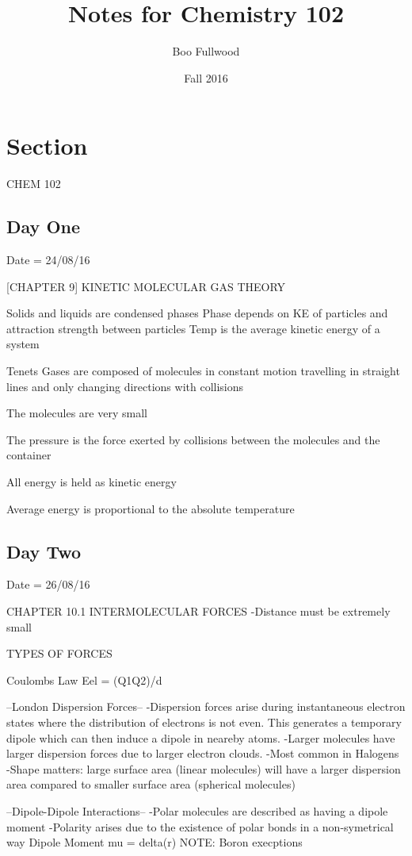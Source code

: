 \documentclass{article}
\title{Notes for Chemistry 102}
\date{Fall 2016}
\author{Boo Fullwood}
\begin{document}
\maketitle
{}
\newpage

\section{Section}
CHEM 102

\subsection{Day One}
Date = 24/08/16

[CHAPTER 9]
KINETIC MOLECULAR GAS THEORY

Solids and liquids are condensed phases
Phase depends on KE of particles and attraction strength between particles
Temp is the average kinetic energy of a system

Tenets
Gases are composed of molecules in constant motion travelling in straight lines
and only changing directions with collisions

The molecules are very small

The pressure is the force exerted by collisions between the molecules and the
container

All energy is held as kinetic energy

Average energy is proportional to the absolute temperature
\subsection{Day Two}
Date = 26/08/16

CHAPTER 10.1
INTERMOLECULAR FORCES
-Distance must be extremely small

TYPES OF FORCES

{Coulombs Law
Eel = (Q1Q2)/d}

--London Dispersion Forces--
-Dispersion forces arise during instantaneous electron states where the
distribution of electrons is not even. This generates a temporary dipole which
can then induce a dipole in neareby atoms. 
-Larger molecules have larger dispersion forces due to larger electron clouds.
-Most common in Halogens
-Shape matters: large surface area (linear molecules) will have a larger
dispersion area compared to smaller surface area (spherical molecules)

--Dipole-Dipole Interactions--
-Polar molecules are described as having a dipole moment
-Polarity arises due to the existence of polar bonds in a non-symetrical way
{Dipole Moment
mu = delta(r)}
NOTE: Boron execptions
\end{document}
